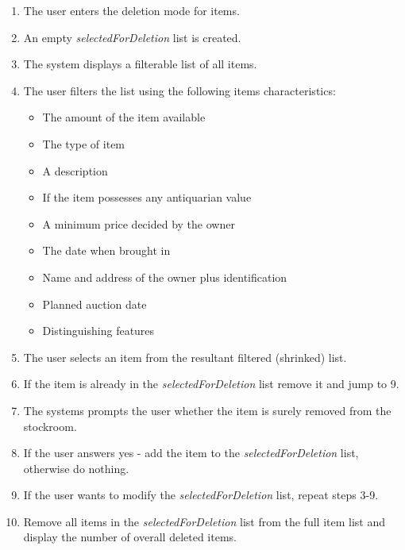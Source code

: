 \begin{enumerate}[noitemsep]
	\item The user enters the deletion mode for items.
	\item An empty \textit{selectedForDeletion} list is created.
	\item The system displays a filterable list of all items.
	\item The user filters the list using the following items characteristics:
	\begin{itemize}[noitemsep]
		\item The amount of the item available
		\item The type of item
		\item A description
		\item If the item possesses any antiquarian value
		\item A minimum price decided by the owner
		\item The date when brought in
		\item Name and address of the owner plus identification
		\item Planned auction date
		\item Distinguishing features
	\end{itemize}
	\item The user selects an item from the resultant filtered (shrinked) list.
	\item If the item is already in the \textit{selectedForDeletion} list remove it and jump to 9.
	\item The systems prompts the user whether the item is surely removed from the stockroom.
	\item If the user answers yes - add the item to the \textit{selectedForDeletion} list, otherwise do nothing.
	\item If the user wants to modify the \textit{selectedForDeletion} list, repeat steps 3-9.
	\item Remove all items in the \textit{selectedForDeletion} list from the full item list and display the number of overall deleted items.
\end{enumerate}

